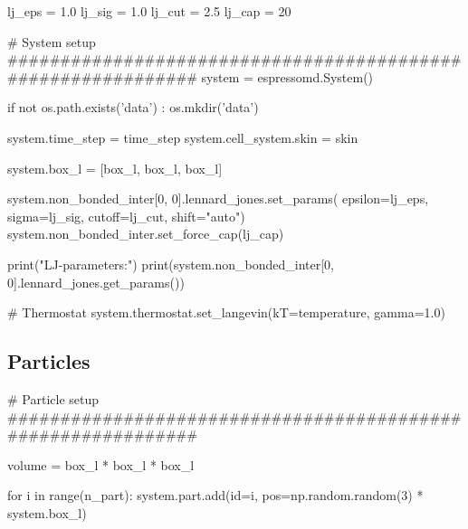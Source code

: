 \documentclass[
paper=a4,                       %
fontsize=11pt,                  %
twoside,                        %
footsepline,                    %
headsepline,                    %
headinclude=false,              %
footinclude=false,              %
pagesize,                       %
]{scrartcl}
\newtheorem{task}{Task}
\begin{document}
{{\begin{pypresso}
lj_eps = 1.0
lj_sig = 1.0
lj_cut = 2.5
lj_cap = 20

# System setup
#############################################################
system              = espressomd.System()

if not os.path.exists('data') :
    os.mkdir('data')

system.time_step    = time_step
system.cell_system.skin  = skin

system.box_l = [box_l, box_l, box_l]

system.non_bonded_inter[0, 0].lennard_jones.set_params(
    epsilon=lj_eps, sigma=lj_sig,
    cutoff=lj_cut, shift="auto")
system.non_bonded_inter.set_force_cap(lj_cap)

print("LJ-parameters:")
print(system.non_bonded_inter[0, 0].lennard_jones.get_params())

# Thermostat
system.thermostat.set_langevin(kT=temperature, gamma=1.0)
\end{pypresso}


\subsection{Particles}

\begin{pypresso}
# Particle setup
#############################################################

volume = box_l * box_l * box_l

for i in range(n_part):
    system.part.add(id=i, pos=np.random.random(3) * system.box_l)
\end{pypresso}}\vspace{0,2cm}

   \vspace{1cm}}
\end{document}
